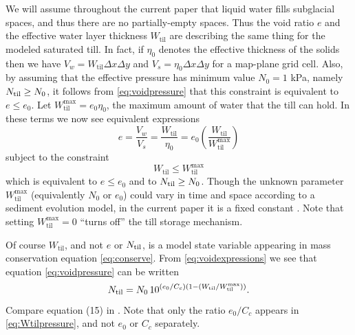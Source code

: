 \documentclass[11pt,final]{amsart}
\newcommand{\Wtil}{W_{\text{til}}}
\newcommand{\Wtilmax}{W_{\text{til}}^{\text{max}}}
\begin{document}
We will assume throughout the current paper that liquid water fills subglacial spaces, and thus there are no partially-empty spaces.  Thus the void ratio $e$ and the effective water layer thickness $\Wtil$ are describing the same thing for the modeled saturated till.  In fact, if $\eta_0$ denotes the effective thickness of the solids then we have $V_w = \Wtil \Delta x \Delta y$ and $V_s = \eta_0 \Delta x \Delta y$ for a map-plane grid cell.  Also, by assuming that the effective pressure has minimum value $N_0=1$ kPa, namely $N_{\text{til}} \ge N_0$, it follows from \eqref{eq:voidpressure} that this constraint is equivalent to $e \le e_0$.  Let $\Wtilmax = e_0 \eta_0$, the maximum amount of water that the till can hold.  In these terms we now see equivalent expressions
\begin{equation}
e = \frac{V_w}{V_s} = \frac{\Wtil}{\eta_0} = e_0 \left(\frac{\Wtil}{\Wtilmax}\right)  \label{eq:voidexpressions}
\end{equation}
subject to the constraint
\begin{equation}
\Wtil \le \Wtilmax \label{eq:Wtilupperbound}
\end{equation}
which is equivalent to $e\le e_0$ and to $N_{\text{til}} \ge N_0$.  Though the unknown parameter $\Wtilmax$ (equivalently $N_0$ or $e_0$) could vary in time and space according to a sediment evolution model, in the current paper it is a fixed constant \citep{BBssasliding,TrufferEchelmeyerHarrison2001}.  Note that setting $\Wtilmax=0$ ``turns off'' the till storage mechanism.

Of course $\Wtil$, and not $e$ or $N_{\text{til}}$, is a model state variable appearing in mass conservation equation \eqref{eq:conserve}.  From \eqref{eq:voidexpressions} we see that equation \eqref{eq:voidpressure} can be written
\begin{equation}
\Ntil = N_0\, 10^{(e_0/C_c) \left(1 - (\Wtil/\Wtilmax)\right)}. \label{eq:Wtilpressure}
\end{equation}
Compare equation (15) in \cite{vanderWeletal2013}.  Note that only the ratio $e_0/C_c$ appears in \eqref{eq:Wtilpressure}, and not $e_0$ or $C_c$ separately.
\end{document}
